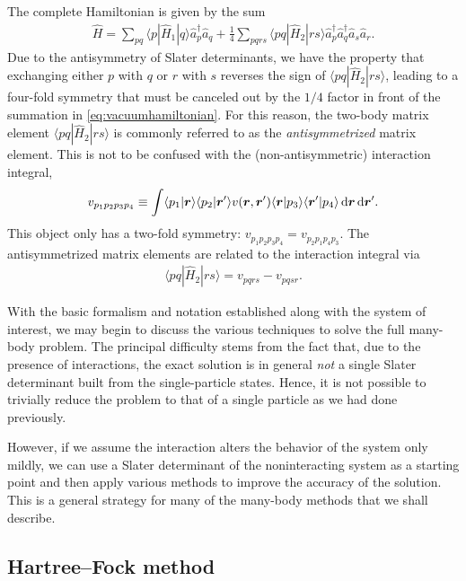 The complete Hamiltonian is given by the sum
\begin{align}
  \hat{H} = \sum_{p q} \langle p | \hat{H}_1 | q \rangle \hat{a}_p^\dagger \hat{a}_q + \frac{1}{4} \sum_{p q r s} \langle p q | \hat{H}_2 | r s \rangle \hat{a}_p^\dagger \hat{a}_q^\dagger \hat{a}_s \hat{a}_r. \label{eq:vacuumhamiltonian}
\end{align}
Due to the antisymmetry of Slater determinants, we have the property that exchanging either $p$ with $q$ or $r$ with $s$ reverses the sign of $\langle p q | \hat{H}_2 | r s \rangle$, leading to a four-fold symmetry that must be canceled out by the $1/4$ factor in front of the summation in \eqref{eq:vacuumhamiltonian}.  For this reason, the two-body matrix element $\langle p q | \hat{H}_2 | r s \rangle$ is commonly referred to as the \emph{antisymmetrized} matrix element.  This is not to be confused with the (non-antisymmetric) interaction integral,
\begin{align} \label{eq:interactionintegral}
  v_{p_1 p_2 p_3 p_4} \equiv \int \langle p_1 | \bm{r} \rangle \langle p_2 | \bm{r}' \rangle v(\bm r, \bm r') \langle \bm{r} | p_3 \rangle \langle \bm{r}' | p_4 \rangle \operatorname{d\!} \bm{r} \operatorname{d\!} \bm{r}'.
\end{align}
This object only has a two-fold symmetry: $v_{p_1 p_2 p_3 p_4} = v_{p_2 p_1 p_4 p_3}$.  The antisymmetrized matrix elements are related to the interaction integral via
\begin{align} \label{eq:antisymmetricmatrixelement}
  \langle p q | \hat{H}_2 | r s \rangle = v_{p q r s} - v_{p q s r}.
\end{align}

With the basic formalism and notation established along with the system of interest, we may begin to discuss the various techniques to solve the full many-body problem.  The principal difficulty stems from the fact that, due to the presence of interactions, the exact solution is in general \emph{not} a single Slater determinant built from the single-particle states.  Hence, it is not possible to trivially reduce the problem to that of a single particle as we had done previously.

However, if we assume the interaction alters the behavior of the system only mildly, we can use a Slater determinant of the noninteracting system as a starting point and then apply various methods to improve the accuracy of the solution.  This is a general strategy for many of the many-body methods that we shall describe.

\subsection{Hartree--Fock method}
\label{subsec:HartreeFockmethod}

